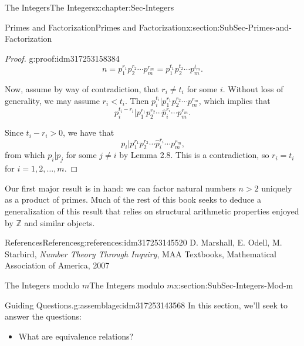 \documentclass[oneside,10pt,]{book}
\numberwithin{equation}{section}
\def\Z{{\mathbb Z}}
\newcommand{\lt}{<}
\begin{document}
\begin{chapterptx}{The Integers}{}{The Integers}{}{}{x:chapter:Sec-Integers}
\begin{sectionptx}{Primes and Factorization}{}{Primes and Factorization}{}{}{x:section:SubSec-Primes-and-Factorization}
\begin{proof}{}{g:proof:idm317253158384}
\begin{equation*}
n = p_1^{r_1} p_2^{r_2} \cdots p_m^{r_m} = p_1^{t_1} p_2^{t_2} \cdots p_m^{t_m}\text{.}
\end{equation*}
%
\par
Now, assume by way of contradiction, that \(r_i \ne t_i\) for some \(i\). Without loss of generality, we may assume \(r_i \lt  t_i\). Then \(p_i^{t_i} | p_1^{r_1} p_2^{r_2} \cdots p_m^{r_m}\), which implies that%
\begin{equation*}
p_i^{t_i - r_i} | p_1^{r_1} p_2^{r_2} \cdots \hat{p}_i^{r_i} \cdots p_m^{r_m}\text{.}
\end{equation*}
%
\par
Since \(t_i - r_i > 0\), we have that%
\begin{equation*}
p_i  | p_1^{r_1} p_2^{r_2} \cdots \hat{p}_i^{r_i} \cdots p_m^{r_m}\text{,}
\end{equation*}
from which \(p_i | p_j\) for some \(j\ne i\) by Lemma 2.8. This is a contradiction, so \(r_i = t_i\) for \(i = 1, 2, \ldots, m\).%
\end{proof}
Our first major result is in hand: we can factor natural numbers \(n > 2\) uniquely as a product of primes. Much of the rest of this book seeks to deduce a generalization of this result that relies on structural arithmetic properties enjoyed by \(\Z\) and similar objects.%
%
%
\typeout{************************************************}
\typeout{************************************************}
%
\begin{references-subsection-numberless}{References}{}{References}{}{}{g:references:idm317253145520}
D. Marshall, E. Odell, M. Starbird, \emph{Number Theory Through Inquiry}, MAA Textbooks, Mathematical Association of America, 2007\end{references-subsection-numberless}
\end{sectionptx}
%
%
\typeout{************************************************}
\typeout{************************************************}
%
\begin{sectionptx}{The Integers modulo \(m\)}{}{The Integers modulo \(m\)}{}{}{x:section:SubSec-Integers-Mod-m}
\begin{assemblage}{Guiding Questions.}{g:assemblage:idm317253143568}%
In this section, we'll seek to answer the questions: %
\begin{itemize}[label=\textbullet]
\item{}What are equivalence relations?%

\end{itemize}
\end{assemblage}
\end{sectionptx}
\end{chapterptx}
\end{document}
